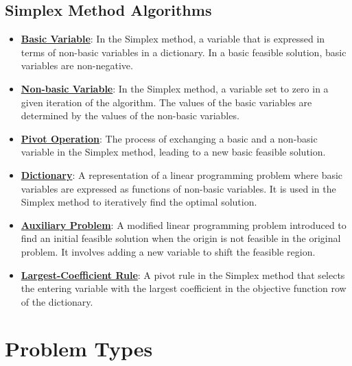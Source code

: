 \documentclass{article}%
\begin{document}
\subsection{Simplex Method Algorithms}%
\label{subsec:SimplexMethodAlgorithms}%
\begin{itemize}[leftmargin=*]%
\item \href{https://www.math.purdue.edu/~yipn/421/2024-08-27-ExSimplex.pdf#page=6}{\textbf{Basic Variable}}: In the Simplex method, a variable that is expressed in terms of non-basic variables in a dictionary. In a basic feasible solution, basic variables are non-negative.%
\item \href{https://www.math.purdue.edu/~yipn/421/2024-08-27-ExSimplex.pdf#page=6}{\textbf{Non-basic Variable}}: In the Simplex method, a variable set to zero in a given iteration of the algorithm. The values of the basic variables are determined by the values of the non-basic variables.%
\item \href{https://www.math.purdue.edu/~yipn/421/2024-08-27-ExSimplex.pdf#page=9}{\textbf{Pivot Operation}}: The process of exchanging a basic and a non-basic variable in the Simplex method, leading to a new basic feasible solution.%
\item \href{https://www.math.purdue.edu/~yipn/421/2024-08-27-ExSimplex.pdf#page=26}{\textbf{Dictionary}}: A representation of a linear programming problem where basic variables are expressed as functions of non-basic variables. It is used in the Simplex method to iteratively find the optimal solution.%
\item \href{https://www.math.purdue.edu/~yipn/421/2024-08-27-ExSimplex.pdf#page=32}{\textbf{Auxiliary Problem}}: A modified linear programming problem introduced to find an initial feasible solution when the origin is not feasible in the original problem. It involves adding a new variable to shift the feasible region.%
\item \href{https://www.math.purdue.edu/~yipn/421/2024-09-05-SimplexEfficiency.pdf#page=4}{\textbf{Largest-Coefficient Rule}}: A pivot rule in the Simplex method that selects the entering variable with the largest coefficient in the objective function row of the dictionary.%
\end{itemize}

%
\section{Problem Types}%
\label{sec:ProblemTypes}%
\end{document}
